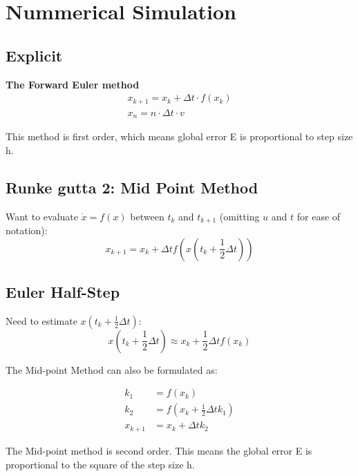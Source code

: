 \section{Nummerical Simulation}

\subsection{Explicit }

\textbf{The Forward Euler method}
\begin{subequations}
\begin{align}
    x_{k+1} = x_k + \Delta t \cdot f(x_k)\\
    x_n = n \cdot \Delta t \cdot v \label{eq:Euler}
\end{align}
\end{subequations}

This method is first order, which means global error E is proportional to step size h. 

\subsection{Runke gutta 2: Mid Point Method }

Want to evaluate \(\dot{x} = f(x)\) between \(t_k\) and \(t_{k+1}\) (omitting \(u\) and \(t\) for ease of notation):
\begin{equation}
x_{k+1} = x_k + \Delta t f\left( x \left( t_k + \frac{1}{2} \Delta t \right) \right)
\end{equation}

\subsection*{Euler Half-Step}
Need to estimate \(x \left( t_k + \frac{1}{2} \Delta t \right)\):
\begin{equation}
x \left( t_k + \frac{1}{2} \Delta t \right) \approx x_k + \frac{1}{2} \Delta t f(x_k)
\end{equation}

The Mid-point Method can also be formulated as:

\begin{align}
k_1 &= f(x_k) \\
k_2 &= f\left(x_k + \frac{1}{2} \Delta t k_1\right) \\
x_{k+1} &= x_k + \Delta t k_2
\end{align}

The Mid-point method is second order.  This means the global error E is proportional to the square of the step size h.